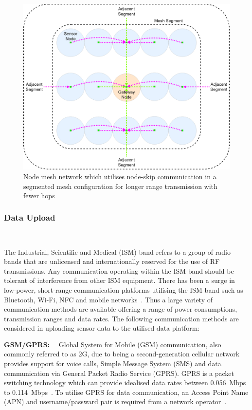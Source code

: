 \documentclass[10pt,twocolumn]{witseiepaper}
\begin{document}
			\begin{figure}
				\centering
				\includegraphics[width=1\columnwidth]{media/segment-mesh.png}
				\vspace{1em}
				\caption{Node mesh network which utilises node-skip communication in a segmented mesh configuration for longer range transmission with fewer hops}
				\raggedright
				\label{fig:segment}
			\end{figure}
	
		\subsubsection{Data Upload} $   $
		
			The Industrial, Scientific and Medical (ISM) band refers to a group of radio bands that are unlicensed and internationally reserved for the use of RF transmissions. Any communication operating within the ISM band should be tolerant of interference from other ISM equipment. There has been a surge in low-power, short-range communication platforms utilising the ISM band such as Bluetooth, \mbox{Wi-Fi}, NFC and mobile networks~\cite{ism}. Thus a large variety of communication methods are available offering a range of power consumptions, transmission ranges and data rates. The following communication methods are considered in uploading sensor data to the utilised data platform:
			
				\textbf{GSM/GPRS:}~~
				Global System for Mobile (GSM) communication, also commonly referred to as 2G, due to being a second-generation cellular network provides support for voice calls, Simple Message System (SMS) and data communication via General Packet Radio Service (GPRS). GPRS is a packet switching technology which can provide idealised data rates between 0.056~Mbps to 0.114~Mbps~\cite{gprs}. To utilise GPRS for data communication, an Access Point Name (APN) and username/passward pair is required from a network operator~\cite{gprs}.
				
\end{document}
